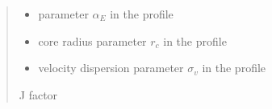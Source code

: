 \documentclass[letterpaper,10pt,english]{sphinxmanual}
\begin{document}
\begin{fulllineitems}
\begin{quote}
\begin{description}
\begin{itemize}
\item {} 
\sphinxAtStartPar
{} \textendash{} parameter \(\alpha_E\) in the {\hyperref[\detokenize{diffsph.profiles:diffsph.profiles.templates.enst}]{}} profile

\item {} 
\sphinxAtStartPar
{} \textendash{} core radius parameter \(r_c\) in the {\hyperref[\detokenize{diffsph.profiles:diffsph.profiles.templates.cnfw}]{}} profile

\item {} 
\sphinxAtStartPar
{} \textendash{} velocity dispersion parameter \(\sigma_v\) in the {\hyperref[\detokenize{diffsph.profiles:diffsph.profiles.templates.sis}]{}} profile

\end{itemize}

\sphinxAtStartPar
J factor

\end{description}\end{quote}

\end{fulllineitems}

\end{document}
